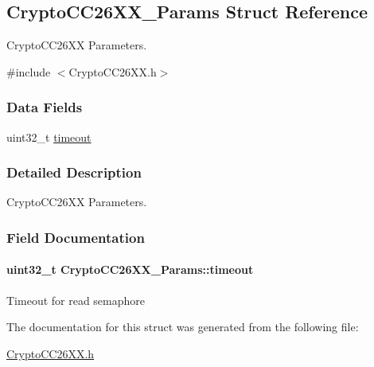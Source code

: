 \subsection{Crypto\+C\+C26\+X\+X\+\_\+\+Params Struct Reference}
\label{struct_crypto_c_c26_x_x___params}


Crypto\+C\+C26\+X\+X Parameters.  




{\ttfamily \#include $<$Crypto\+C\+C26\+X\+X.\+h$>$}

\subsubsection*{Data Fields}
\begin{DoxyCompactItemize}
\item 
uint32\+\_\+t \hyperlink{struct_crypto_c_c26_x_x___params_a0a0722be7543d9ff4de0c1107357758c}{timeout}
\end{DoxyCompactItemize}


\subsubsection{Detailed Description}
Crypto\+C\+C26\+X\+X Parameters. 

\subsubsection{Field Documentation}
\paragraph[{timeout}]{\setlength{\rightskip}{0pt plus 5cm}uint32\+\_\+t Crypto\+C\+C26\+X\+X\+\_\+\+Params\+::timeout}\label{struct_crypto_c_c26_x_x___params_a0a0722be7543d9ff4de0c1107357758c}
Timeout for read semaphore 

The documentation for this struct was generated from the following file\+:\begin{DoxyCompactItemize}
\item 
\hyperlink{_crypto_c_c26_x_x_8h}{Crypto\+C\+C26\+X\+X.\+h}\end{DoxyCompactItemize}
